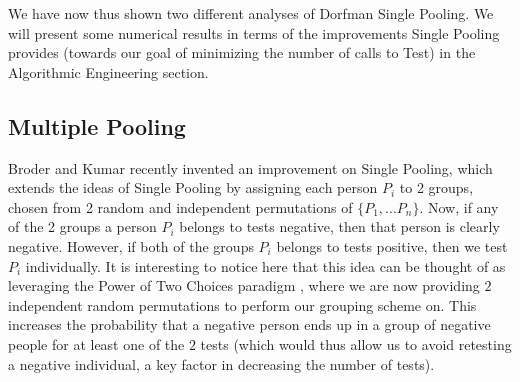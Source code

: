 \documentclass[12pt]{article}
\newtheorem{claim}[theorem]{Claim}
\begin{document}

We have now thus shown two different analyses of Dorfman Single Pooling. We will present some numerical results in terms of the improvements Single Pooling provides (towards our goal of minimizing the number of calls to {\sf Test}) in the Algorithmic Engineering section.

\subsection{Multiple Pooling}

Broder and Kumar recently invented an improvement on Single Pooling, which extends the ideas of Single Pooling by assigning each person $P_i$ to 2 groups, chosen from 2 random and independent permutations of $\{P_1,...P_n\}$. Now, if any of the 2 groups a person $P_i$ belongs to tests negative, then that person is clearly negative. However, if both of the groups $P_i$ belongs to tests positive, then we test $P_i$ individually. It is interesting to notice here that this idea can be thought of as leveraging the Power of Two Choices paradigm \cite{choices}, where we are now providing $2$ independent random permutations to perform our grouping scheme on. This increases the probability that a negative person ends up in a group of negative people for at least one of the $2$ tests (which would thus allow us to avoid retesting a negative individual, a key factor in decreasing the number of tests).
\end{document}
